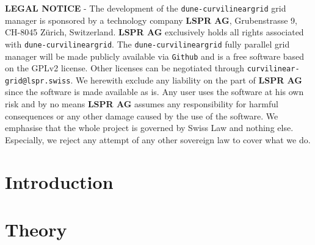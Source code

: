 \documentclass[a4paper,11pt]{book}
\begin{document}

\vspace{20mm}
{\small
\noindent \textbf{LEGAL NOTICE} - The development of the \texttt{dune-curvilineargrid} grid manager is sponsored by a technology company \textbf{LSPR AG}, Grubenstrasse 9, CH-8045 Z\"urich, Switzerland. \textbf{LSPR AG} exclusively holds all rights associated with \texttt{dune-curvilineargrid}.
The \texttt{dune-curvilineargrid} fully parallel grid manager will be made publicly available via \texttt{Github} and is a free software based on the GPLv2 license. Other licenses can be negotiated through \texttt{curvilinear-grid@lspr.swiss}.
We herewith exclude any liability on the part of \textbf{LSPR AG} since the software is made available as is. Any user uses the software at his own risk and by no means \textbf{LSPR AG} assumes any responsibility for harmful consequences or any other damage caused by the use of the software. We emphasise that the whole project is governed by Swiss Law and nothing else. Especially, we reject any attempt of any other sovereign law to cover what we do.
}


\tableofcontents


\newpage
\chapter{Introduction}








\newpage
\chapter{Theory}





\end{document}
